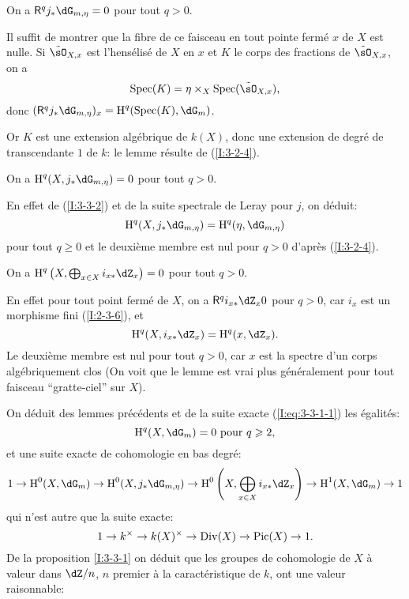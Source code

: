 \begin{lemma}\label{I:3-3-2}
On a $\R^q j_* \dG_{m,\eta} = 0$ pour tout $q>0$.
\end{lemma}

Il suffit de montrer que la fibre de ce faisceau en tout pointe fermé $x$ 
de $X$ est nulle. Si $\tilde\sO_{X,x}$ est l'hensélisé de $X$ en $x$ et $K$ 
le corps des fractions de $\tilde\sO_{X,x}$, on a 
\[
  \spec(K) = \eta\times_X \spec(\tilde\sO_{X,x})\text{,}
\]
donc $(\R^qj_*\dG_{m,\eta})_x = \h^q(\spec(K),\dG_m)$. 

Or $K$ est une extension algébrique de $k(X)$, donc une extension de degré 
de transcendante $1$ de $k$: le lemme résulte de (\ref{I:3-2-4}). 





\begin{lemma}\label{I:3-3-3}
On a $\h^q(X, j_*\dG_{m,\eta}) = 0$ pour tout $q>0$.
\end{lemma}

En effet de (\ref{I:3-3-2}) et de la suite spectrale de Leray pour $j$, on 
déduit:
\[
  \h^q(X, j_* \dG_{m,\eta}) = \h^q(\eta,\dG_{m,\eta})
\]
pour tout $q\geqslant 0$ et le deuxième membre est nul pour $q>0$ d'après 
(\ref{I:3-2-4}). 





\begin{lemma}\label{I:3-3-4}
On a $\h^q\left(X,\bigoplus_{x\in X} i_{x*} \dZ_x\right) = 0$ pour tout $q>0$. 
\end{lemma}

En effet pour tout point fermé de $X$, on a $\R^q i_{x*}\dZ_x 0$ pour $q>0$, 
car $i_x$ est un morphisme fini (\ref{I:2-3-6}), et 
\[
  \h^q(X,i_{x*}\dZ_x) = \h^q(x,\dZ_x)\text{.}
\]
Le deuxième membre est nul pour tout $q>0$, car $x$ est la spectre d'un 
corps algébriquement clos (On voit que le lemme est vrai plus 
généralement pour tout faisceau ``gratte-ciel'' sur $X$). 

On déduit des lemmes précédents et de la suite exacte (\ref{I:eq:3-3-1-1}) 
les égalités:
\[
  \h^q(X,\dG_m) = 0 \text{ pour $q\geqslant 2$,}
\]
et une suite exacte de cohomologie en bas degré:
\[
  1 \to \h^0(X,\dG_m) \to \h^0(X, j_*\dG_{m,\eta}) \to \h^0\left(X,\bigoplus_{x\in X} i_{x*}\dZ_x\right) \to \h^1(X,\dG_m) \to 1
\]
qui n'est autre que la suite exacte:
\[
  1 \to k^\times \to k(X)^\times\to \operatorname{Div}(X) \to \operatorname{Pic}(X) \to 1\text{.}
\]
De la proposition \ref{I:3-3-1} on déduit que les groupes de cohomologie de 
$X$ à valeur dans $\dZ/n$, $n$ premier à la caractéristique de $k$, ont 
une valeur raisonnable:






